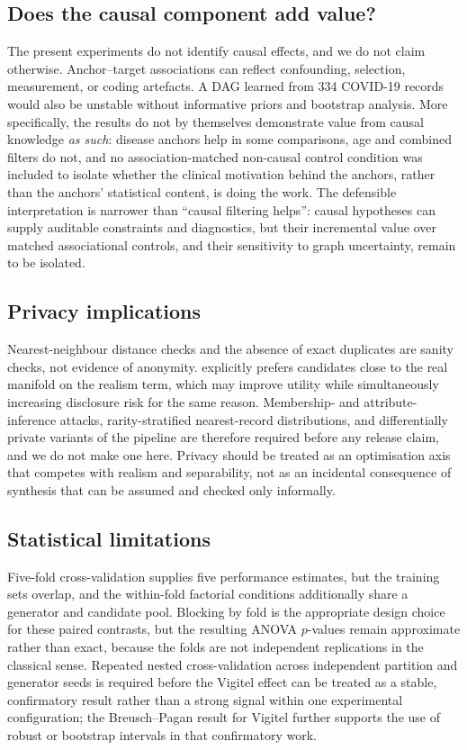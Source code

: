 \subsection{Does the causal component add value?}
\label{sec:causal-discussion}

The present experiments do not identify causal effects, and we do not claim otherwise. Anchor--target associations can reflect confounding, selection, measurement, or coding artefacts. A DAG learned from 334 COVID-19 records would also be unstable without informative priors and bootstrap analysis. More specifically, the \dacpf{} results do not by themselves demonstrate value from causal knowledge \emph{as such}: disease anchors help in some comparisons, age and combined filters do not, and no association-matched non-causal control condition was included to isolate whether the clinical motivation behind the anchors, rather than the anchors' statistical content, is doing the work. The defensible interpretation is narrower than ``causal filtering helps'': causal hypotheses can supply auditable constraints and diagnostics, but their incremental value over matched associational controls, and their sensitivity to graph uncertainty, remain to be isolated.

\subsection{Privacy implications}
\label{sec:privacy-discussion}

Nearest-neighbour distance checks and the absence of exact duplicates are sanity checks, not evidence of anonymity. \sepa{} explicitly prefers candidates close to the real manifold on the realism term, which may improve utility while simultaneously increasing disclosure risk for the same reason. Membership- and attribute-inference attacks, rarity-stratified nearest-record distributions, and differentially private variants of the pipeline are therefore required before any release claim, and we do not make one here. Privacy should be treated as an optimisation axis that competes with realism and separability, not as an incidental consequence of synthesis that can be assumed and checked only informally.

\subsection{Statistical limitations}
\label{sec:stat-limitations}

Five-fold cross-validation supplies five performance estimates, but the training sets overlap, and the within-fold factorial conditions additionally share a generator and candidate pool. Blocking by fold is the appropriate design choice for these paired contrasts, but the resulting ANOVA $p$-values remain approximate rather than exact, because the folds are not independent replications in the classical sense. Repeated nested cross-validation across independent partition and generator seeds is required before the Vigitel effect can be treated as a stable, confirmatory result rather than a strong signal within one experimental configuration; the Breusch--Pagan result for Vigitel further supports the use of robust or bootstrap intervals in that confirmatory work.

